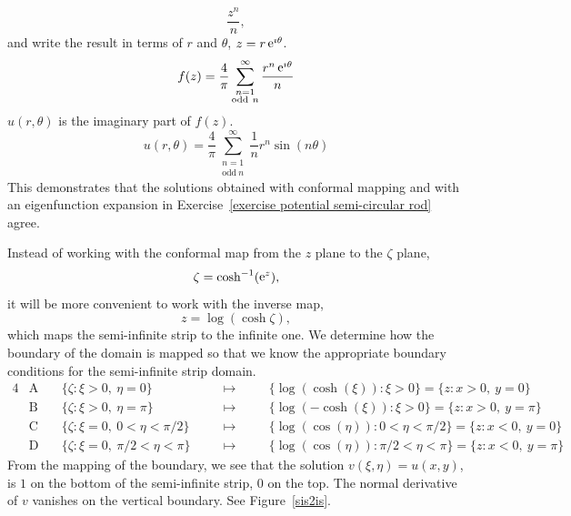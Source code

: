 {\begin{Solution}
\[  \frac{z^n}{n},
  \]
  and write the result in terms of $r$ and $\theta$, $z = r \mathop{\mathrm{e}}\nolimits^{\imath \theta}$.
  \[
  f(z) = \frac{4}{\pi} \sum_{\substack{n = 1 \\ \mathrm{odd}\ n}}^\infty
  \frac{r^n \mathop{\mathrm{e}}\nolimits^{\imath \theta}}{n}
  \]
  $u(r,\theta)$ is the imaginary part of $f(z)$.
  \[
  \boxed{
    u(r,\theta) = \frac{4}{\pi} \sum_{\substack{n = 1 \\ \mathrm{odd}\ n}}^\infty
    \frac{1}{n} r^n \sin(n \theta)
    }
  \]
  This demonstrates that the solutions obtained with conformal mapping and 
  with an eigenfunction expansion in 
  Exercise~\ref{exercise potential semi-circular rod} agree.
\end{Solution}











\begin{Solution}
  Instead of working with the conformal map from the $z$ plane to the $\zeta$
  plane,
  \[
  \zeta = \cosh^{-1} (\mathop{\mathrm{e}}\nolimits^z),
  \]
  it will be more convenient to work with the inverse map,
  \[
  z = \log ( \cosh \zeta ),
  \]
  which maps the semi-infinite strip to the infinite one.  We determine how
  the boundary of the domain is mapped so that we know the appropriate 
  boundary conditions for the semi-infinite strip domain.
  \begin{alignat*}{4}
    &\mathrm{A} \quad &\{ \zeta : \xi > 0,\ \eta = 0 \} &\quad &\mapsto &\quad
    &\{ \log( \cosh( \xi )) : \xi > 0 \} = \{ z : x > 0,\ y = 0 \} \\
    &\mathrm{B} \quad &\{ \zeta : \xi > 0,\ \eta = \pi \} &\quad &\mapsto &\quad
    &\{ \log( - \cosh( \xi )) : \xi > 0 \} = \{ z : x > 0,\ y = \pi \} \\
    &\mathrm{C} \quad &\{ \zeta : \xi = 0,\ 0 < \eta < \pi/2 \} &\quad &\mapsto &\quad
    &\{ \log( \cos( \eta )) : 0 < \eta < \pi/2 \} = \{ z : x < 0,\ y = 0 \} \\
    &\mathrm{D} \quad &\{ \zeta : \xi = 0,\ \pi/2 < \eta <\pi\} &\quad &\mapsto &\quad
    &\{ \log( \cos( \eta )) : \pi/2 < \eta < \pi \} = \{ z : x < 0,\ y = \pi \}
  \end{alignat*}
  From the mapping of the boundary, we see that the solution 
  $v(\xi,\eta) = u(x,y)$, is $1$ on the bottom of the semi-infinite strip,
  $0$ on the top.  The normal derivative of $v$ vanishes on the vertical 
  boundary.  See Figure~\ref{sis2is}.


\end{Solution}}
